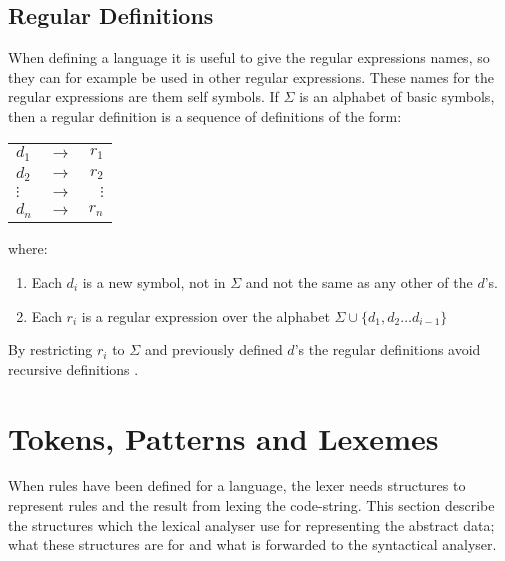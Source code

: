 \subsection{Regular Definitions}
When defining a language it is useful to give the regular expressions names, 
so they can for example be used in other regular expressions. These names for
the regular expressions are them self symbols. If $\Sigma$ is an alphabet of 
basic symbols, then a regular definition is a sequence of definitions of the form:
\begin{center}
\begin{tabular}{l c r}
$d_1$ & $\to$ & $r_1$\\
$d_2$ & $\to$ & $r_2$\\
$\vdots$ & $\to$ & $\vdots$\\
$d_n$ & $\to$ & $r_n$\\

\end{tabular}
\end{center}
where:
\begin{enumerate}
\item Each $d_i$ is a new symbol, not in $\Sigma$ and not the same as any other 
of the $d$'s.
\item Each $r_i$ is a regular expression over the alphabet $\Sigma  \cup \{d_1, 
d_2 \dots d_{i-1}\}$
\end{enumerate}
By restricting $r_i$ to $\Sigma$ and previously defined $d$'s the regular 
definitions avoid recursive definitions \cite{Aho2006}.

\section{Tokens, Patterns and Lexemes}
When rules have been defined for a language, the lexer needs structures to
represent rules and the result from lexing the code-string. 
This section describe the structures which the lexical analyser use
for representing the abstract data; what these structures are for and what is 
forwarded to the syntactical analyser. 

